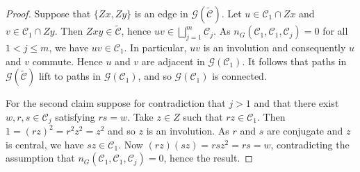 \documentclass[10pt,a4paper]{amsart}
\newcommand{\GG}{\mathcal{G}}
\begin{document}
\begin{proof} Suppose that $\{Zx,Zy\}$ is an edge in $\GG(\widetilde{\mathcal C})$. Let $u\in \mathcal C_1 \cap Zx$ and $v \in \mathcal C_1 \cap Zy$. Then $Z xy\in \widetilde {\mathcal{C}}$, hence $uv \in \bigsqcup_{j=1}^m\mathcal{C}_j$. As $n_G(\mathcal{C}_1,\mathcal{C}_1,\mathcal{C}_j)=0$ for all $1<j\le m$, we have $uv \in \mathcal C_1$. In particular, $uv$ is an involution and consequently $u$ and $v$ commute. Hence $u$ and $v$ are adjacent in $\GG(\mathcal{C}_1)$. It follows that paths in $\GG(\widetilde{\mathcal{C}})$ lift to paths in $\GG(\mathcal{C}_1)$, and so
$\GG(\mathcal {C}_1)$ is connected.


For the second claim suppose for contradiction that $j>1$ and that there exist $w,r,s\in \mathcal{C}_j$ satisfying $rs=w$. Take $z\in Z$ such that $rz\in\mathcal{C}_1$. Then $1=(rz)^2=r^2z^2=z^2$ and so $z$ is an involution. As $r$ and $s$ are conjugate and $z$ is central, we have $sz\in \mathcal C_1$. Now  $(rz)(sz)=rsz^2=rs=w$, contradicting the assumption that $n_G(\mathcal{C}_1,\mathcal{C}_1,\mathcal{C}_j)=0$, hence the result.
\end{proof}
\end{document}
